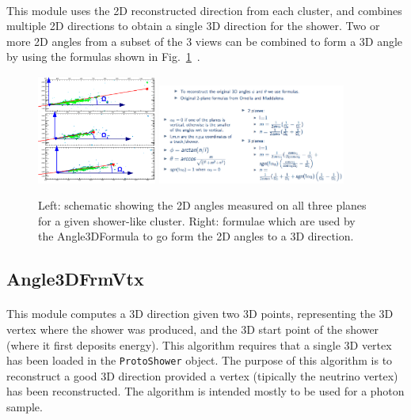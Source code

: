 \paragraph{}This module uses the 2D reconstructed direction from each cluster, and combines multiple 2D directions to obtain a single 3D direction for the shower. Two or more 2D angles from a subset of the 3 views can be combined to form a 3D angle by using the formulas shown in Fig.~\ref{fig:Angle3DFormula}~\cite{bib:showerreco3DDir}.
\begin{figure}[H]
\centering
\includegraphics[width=0.35\textwidth]{figures/Angle3DFormula_00.png}
\includegraphics[width=0.55\textwidth]{figures/Angle3DFormula_01.png}
\caption{Left: schematic showing the 2D angles measured on all three planes for a given shower-like cluster. Right: formulae which are used by the Angle3DFormula to go form the 2D angles to a 3D direction.}
\label{fig:Angle3DFormula}
\end{figure}

\subsection{Angle3DFrmVtx}
\paragraph{}This module computes a 3D direction given two 3D points, representing the 3D vertex where the shower was produced, and the 3D start point of the shower (where it first deposits energy). This algorithm requires that a single 3D vertex has been loaded in the \texttt{ProtoShower} object. The purpose of this algorithm is to reconstruct a good 3D direction provided a vertex (tipically the neutrino vertex) has been reconstructed. The algorithm is intended mostly to be used for a photon sample.
